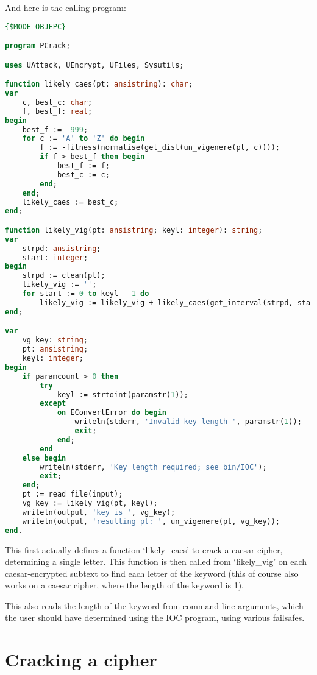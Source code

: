 \documentclass{article}
\begin{document}
    And here is the calling program:

\begin{lstlisting}[language=Pascal, caption=Keyword-cracking program (PCrack.pas)]
{$MODE OBJFPC}

program PCrack;

uses UAttack, UEncrypt, UFiles, Sysutils;

function likely_caes(pt: ansistring): char;
var
    c, best_c: char;
    f, best_f: real;
begin
    best_f := -999;
    for c := 'A' to 'Z' do begin
        f := -fitness(normalise(get_dist(un_vigenere(pt, c))));
        if f > best_f then begin
            best_f := f;
            best_c := c;
        end;
    end;
    likely_caes := best_c;
end;

function likely_vig(pt: ansistring; keyl: integer): string;
var
    strpd: ansistring;
    start: integer;
begin
    strpd := clean(pt);
    likely_vig := '';
    for start := 0 to keyl - 1 do
        likely_vig := likely_vig + likely_caes(get_interval(strpd, start, keyl));
end;

var
    vg_key: string;
    pt: ansistring;
    keyl: integer;
begin
    if paramcount > 0 then
        try
            keyl := strtoint(paramstr(1));
        except
            on EConvertError do begin
                writeln(stderr, 'Invalid key length ', paramstr(1));
                exit;
            end;
        end
    else begin
        writeln(stderr, 'Key length required; see bin/IOC');
        exit;
    end;
    pt := read_file(input);
    vg_key := likely_vig(pt, keyl);
    writeln(output, 'key is ', vg_key);
    writeln(output, 'resulting pt: ', un_vigenere(pt, vg_key));
end.
\end{lstlisting}
\iffalse $ \fi %

    This first actually defines a function `likely\_caes' to crack a caesar
    cipher, determining a single letter. This function is then called from
    `likely\_vig' on each caesar-encrypted subtext to find each letter of the
    keyword (this of course also works on a caesar cipher, where the length of
    the keyword is 1).

    This also reads the length of the keyword from command-line arguments,
    which the user should have determined using the IOC program, using various
    failsafes.

    \section{Cracking a cipher}
\end{document}
